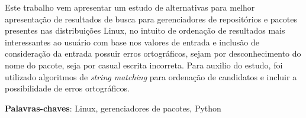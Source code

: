 \begin{resumo}

Este trabalho vem apresentar um estudo de alternativas para melhor apresentação de resultados de busca para gerenciadores de repositórios e pacotes presentes nas distribuições Linux, no intuito de ordenação de resultados mais interessantes ao usuário com base nos valores de entrada e inclusão de consideração da entrada possuir erros ortográficos, sejam por desconhecimento do nome do pacote, seja por casual escrita incorreta. Para auxilio do estudo, foi utilizado algoritmos de \textit{string matching} para ordenação de candidatos e incluir a possibilidade de erros ortográficos.

 \vspace{\onelineskip}
    
 \noindent
 \textbf{Palavras-chaves}: Linux, gerenciadores de pacotes, Python
\end{resumo}
